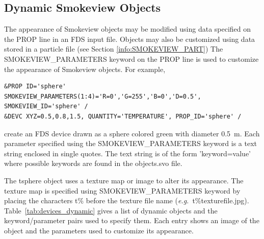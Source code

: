 \subsection{Dynamic Smokeview Objects}
\label{info:SMOKEVIEW_PARAMETERS}

The appearance of Smokeview objects may be modified using data specified on the {\ct PROP} line in an FDS input file. Objects may
also be customized using data stored in a particle file (see Section \ref{info:SMOKEVIEW_PART}) The {\ct SMOKEVIEW\_PARAMETERS}
keyword on the {\ct PROP} line is used to customize the appearance of Smokeview objects.  For example,
\begin{lstlisting} 
&PROP ID='sphere' SMOKEVIEW_PARAMETERS(1:4)='R=0','G=255','B=0','D=0.5', SMOKEVIEW_ID='sphere' /
&DEVC XYZ=0.5,0.8,1.5, QUANTITY='TEMPERATURE', PROP_ID='sphere' /
\end{lstlisting}
create an FDS device drawn as a sphere colored green with diameter 0.5~m. Each parameter specified using the {\ct SMOKEVIEW\_PARAMETERS} keyword is a text string enclosed in single quotes.  The text string is of the form {\ct 'keyword=value'} where possible keywords are found in the {\ct objects.svo} file.

The {\ct tsphere} object uses a texture map or image to alter its appearance. The texture map is specified using {\ct SMOKEVIEW\_PARAMETERS} keyword by placing the characters {\ct t\%} before the texture file name ({\em e.g.}\ {\ct t\%texturefile.jpg}). Table~\ref{tab:devices_dynamic} gives a list of dynamic objects and the keyword/parameter pairs used to specify them. Each entry shows an image of the object and the parameters used to customize its appearance.

